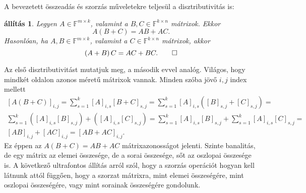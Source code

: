 \documentclass[a4paper, showtrims]{memoir}
\makeatletter
\renewenvironment{proof}[1][\proofname]
    {\par\pushQED{\qed}%
    \normalfont \topsep6\p@\@plus6\p@\relax
    \trivlist
    \item[\hskip\labelsep
        \itshape
    #1\@addpunct{:}]\ignorespaces}
    {\popQED\endtrivlist\@endpefalse}
\theoremstyle{plain}
\newtheorem{proposition}{állítás}[chapter]
\theoremstyle{remark}
\theoremstyle{definition}
\makeatother
\begin{document}
A bevezetett összeadás és szorzás műveletekre teljesül a disztributivitás is:
\begin{proposition}
	Legyen $A\in\mathbb{F}^{m\times k}$, valamint a $B,C\in\mathbb{F}^{k\times n}$ mátrixok.
	Ekkor
	\begin{displaymath}
		A\left( B+C \right)=AB+AC.
	\end{displaymath}
	Hasonlóan,
	ha $A,B\in\mathbb{F}^{m\times k}$, valamint a $C\in\mathbb{F}^{k\times n}$ mátrixok,
	akkor
	\begin{displaymath}
		\left( A+B \right)C=AC+BC.\qedhere
	\end{displaymath}
\end{proposition}
\begin{proof}
	Az első disztributivitást mutatjuk meg, a második evvel analóg.
	Világos, hogy mindkét oldalon azonos méretű mátrixok vannak.
	Minden szóba jövő $i,j$ index mellett
	\begin{multline*}
		\left[ A\left( B+C \right) \right]_{i,j}
		=
		\sum_{s=1}^k[A]_{i,s}\left[ B+C \right]_{s,j}
		=
		\sum_{s=1}^k[A]_{i,s}\left([B]_{s,j}+[C]_{s,j} \right)
		=\\
		\sum_{s=1}^k\left( [A]_{i,s}[B]_{s,j}\right)+\left([A]_{i,s}[C]_{s,j} \right)
		=
		\sum_{s=1}^k[A]_{i,s}[B]_{s,j}
		+
		\sum_{s=1}^k[A]_{i,s}[C]_{s,j}
		=\\
		\left[ AB \right]_{i,j}+\left[ AC \right]_{i,j}
		=
		[AB+AC]_{i,j}.
	\end{multline*}
	Ez éppen  az $A\left( B+C \right)=AB+AC$ mátrixazonosságot jelenti.
\end{proof}
Szinte banalitás,
de egy mátrix az elemei összesége, de a sorai összesége, sőt az oszlopai összesége is.
A következő ultrafontos állítás arról szól, hogy a szorzás operációt hogyan kell látnunk attól függően,
hogy a szorzat mátrixra,
mint elemei összeségére,
mint oszlopai összeségére,
vagy mint sorainak összeségére gondolunk.
\end{document}
